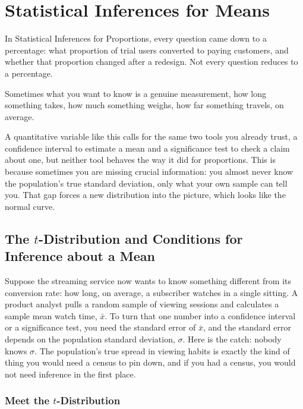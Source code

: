 \chapter{Statistical Inferences for Means}

In Statistical Inferences for Proportions, every question came down to a percentage: what proportion of trial users converted to paying customers, and whether that proportion changed after a redesign. Not every question reduces to a percentage. 

Sometimes what you want to know is a genuine measurement, how long something takes, how much something weighs, how far something travels, on average. 

A quantitative variable like this calls for the same two tools you already trust, a confidence interval to estimate a mean and a significance test to check a claim about one, but neither tool behaves the way it did for proportions. This is because sometimes you are missing crucial information: you almost never know the population's true standard deviation, only what your own sample can tell you. That gap forces a new distribution into the picture, which looks like the  normal curve. 

\section{The \texorpdfstring{$t$}{t}-Distribution and Conditions for Inference about a Mean}




Suppose the streaming service now wants to know something different from its conversion rate: how long, on average, a subscriber watches in a single sitting. A product analyst pulls a random sample of viewing sessions and calculates a sample mean watch time, $\bar{x}$. To turn that one number into a confidence interval or a significance test, you need the standard error of $\bar{x}$, and the standard error depends on the population standard deviation, $\sigma$. Here is the catch: nobody knows $\sigma$. The population's true spread in viewing habits is exactly the kind of thing you would need a census to pin down, and if you had a census, you would not need inference in the first place.

\subsection{Meet the \texorpdfstring{$t$}{t}-Distribution}

